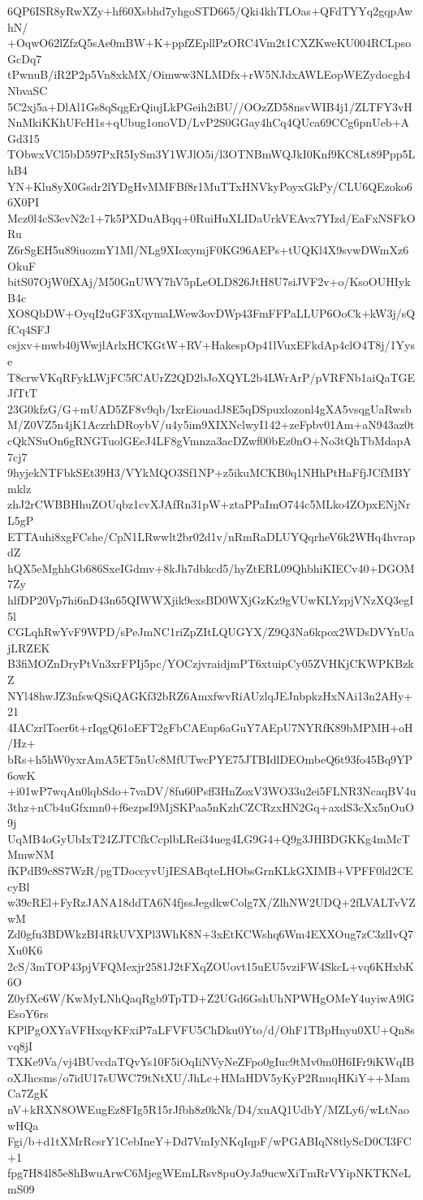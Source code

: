 6QP6ISR8yRwXZy+hf60Xsbhd7yhgoSTD665/Qki4khTLOas+QFdTYYq2gqpAwhN/
+OqwO62lZfzQ5sAe0mBW+K+ppfZEpllPzORC4Vm2t1CXZKweKU004RCLpsoGcDq7
tPwnuB/iR2P2p5Vn8xkMX/Oimww3NLMDfx+rW5NJdxAWLEopWEZydocgh4NbvaSC
5C2xj5a+DlAl1Gs8qSqgErQiujLkPGeih2iBU//OOzZD58nsvWIB4j1/ZLTFY3vH
NnMkiKKhUFcH1s+qUbug1onoVD/LvP2S0GGay4hCq4QUca69CCg6pnUeb+AGd315
TObwxVCl5bD597PxR5IySm3Y1WJlO5i/l3OTNBmWQJkI0Knf9KC8Lt89Ppp5LhB4
YN+Klu8yX0Gsdr2lYDgHvMMFBf8r1MuTTxHNVkyPoyxGkPy/CLU6QEzoko66X0PI
Mcz0l4cS3evN2c1+7k5PXDuABqq+0RuiHuXLIDaUrkVEAvx7YIzd/EaFxNSFkORu
Z6rSgEH5u89iuozmY1Ml/NLg9XIoxymjF0KG96AEPs+tUQKl4X9svwDWmXz6OkuF
bitS07OjW0fXAj/M50GnUWY7hV5pLeOLD826JtH8U7siJVF2v+o/KsoOUHIykB4c
XO8QbDW+OyqI2uGF3XqymaLWew3ovDWp43FmFFPaLLUP6OoCk+kW3j/sQfCq4SFJ
csjxv+mwb40jWwjlArlxHCKGtW+RV+HakespOp41lVuxEFkdAp4clO4T8j/1Yyse
T8crwVKqRFykLWjFC5fCAUrZ2QD2bJoXQYL2b4LWrArP/pVRFNb1aiQaTGEJfTtT
23G0kfzG/G+mUAD5ZF8v9qb/IxrEiouadJ8E5qDSpuxlozonl4gXA5vsqgUaRwsb
M/Z0VZ5n4jK1AczrhDRoybV/u4y5im9XIXNclwyI142+zeFpbv01Am+aN943az0t
cQkNSuOn6gRNGTuolGEeJ4LF8gVmnza3acDZwf00bEz0nO+No3tQhTbMdapA7cj7
9hyjekNTFbkSEt39H3/VYkMQO3Sf1NP+z5ikuMCKB0q1NHhPtHaFfjJCfMBYmklz
zhJ2rCWBBHhuZOUqbz1cvXJAfRn31pW+ztaPPaImO744c5MLko4ZOpxENjNrL5gP
ETTAuhi8xgFCshe/CpN1LRwwlt2br02d1v/nRmRaDLUYQqrheV6k2WHq4hvrapdZ
hQX5eMghhGb686SxeIGdmv+8kJh7dbkcd5/hyZtERL09QhbhiKIECv40+DGOM7Zy
hlfDP20Vp7hi6nD43n65QIWWXjik9exsBD0WXjGzKz9gVUwKLYzpjVNzXQ3egI5l
CGLqhRwYvF9WPD/sPeJmNC1riZpZItLQUGYX/Z9Q3Na6kpox2WDsDVYnUajLRZEK
B3fiMOZnDryPtVn3xrFPIj5pc/YOCzjvraidjmPT6xtuipCy05ZVHKjCKWPKBzkZ
NYl48hwJZ3nfswQSiQAGKf32bRZ6AmxfwvRiAUzlqJEJnbpkzHxNAi13n2AHy+21
4IACzrlToer6t+rIqgQ61oEFT2gFbCAEup6aGuY7AEpU7NYRfK89bMPMH+oH/Hz+
bRs+h5hW0yxrAmA5ET5nUc8MfUTwcPYE75JTBIdlDEOmbeQ6t93fo45Bq9YP6owK
+i01wP7wqAn0lqbSdo+7vaDV/8fu60Psff3HnZoxV3WO33u2ei5FLNR3NcaqBV4u
3thz+nCb4uGfxmn0+f6ezpsI9MjSKPaa5nKzhCZCRzxHN2Gq+axdS3cXx5nOuO9j
UqMB4oGyUbIxT24ZJTCfkCcplbLRei34ueg4LG9G4+Q9g3JHBDGKKg4mMcTMmwNM
fKPdB9c8S7WzR/pgTDoccyvUjIESABqteLHObsGrnKLkGXIMB+VPFF0ld2CEcyBl
w39cREl+FyRzJANA18ddTA6N4fjssJegdkwColg7X/ZlhNW2UDQ+2fLVALTvVZwM
Zd0gfu3BDWkzBI4RkUVXPl3WhK8N+3xEtKCWshq6Wm4EXXOug7zC3zlIvQ7Xu0K6
2cS/3mTOP43pjVFQMexjr2581J2tFXqZOUovt15uEU5vziFW4SkcL+vq6KHxbK6O
Z0yfXe6W/KwMyLNhQaqRgb9TpTD+Z2UGd6GshUhNPWHgOMeY4uyiwA9lGEsoY6rs
KPlPgOXYaVFHxqyKFxiP7aLFVFU5ChDku0Yto/d/OhF1TBpHnyu0XU+Qn8svq8jI
TXKe9Va/vj4BUvcdaTQvYs10F5iOqIiNVyNeZFpo0gIuc9tMv0m0H6IFr9iKWqIB
oXJhcsms/o7idU17sUWC79tNtXU/JhLc+HMaHDV5yKyP2RnuqHKiY++MamCa7ZgK
nV+kRXN8OWEugEz8FIg5R15rJfbh8z0kNk/D4/xuAQ1UdbY/MZLy6/wLtNaowHQa
Fgi/b+d1tXMrRcsrY1CebIneY+Dd7VmIyNKqIqpF/wPGABIqN8tlyScD0CI3FC+1
fpg7H84l85e8hBwuArwC6MjegWEmLRsv8puOyJa9ucwXiTmRrVYipNKTKNeLmS09
